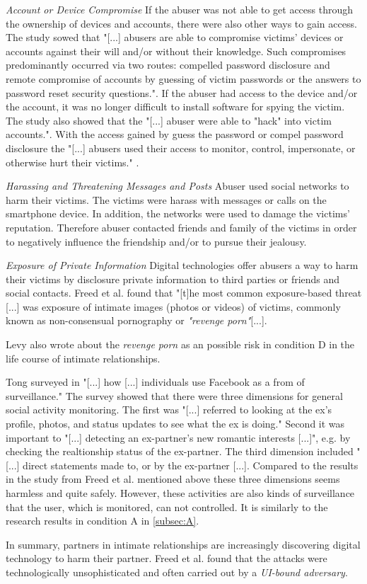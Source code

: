 \textit{Account or Device Compromise}
If the abuser was not able to get access through the ownership of devices and accounts, there were also other ways to gain access. The study sowed that "[...] abusers are able to compromise victims' devices or accounts against their will and/or without their knowledge. Such compromises predominantly occurred via two routes: compelled password disclosure and remote compromise of accounts by guessing of victim passwords or the answers to password reset security questions.". If the abuser had access to the device and/or the account, it was no longer difficult to install software for spying the victim.
The study also showed that the "[...] abuser were able to "hack" into victim accounts.". With the access gained by guess the password or compel password disclosure the "[...] abusers used their access to monitor, control, impersonate, or otherwise hurt their victims." \cite{freed2018stalker}.

\textit{Harassing and Threatening Messages and Posts}
Abuser used social networks to harm their victims. The victims were harass with messages or calls on the smartphone device. In addition, the networks were used to damage the victims' reputation.
Therefore abuser contacted friends and family of the victims in order to negatively influence the friendship and/or to pursue their jealousy.

\textit{Exposure of Private Information}
Digital technologies offer abusers a way to harm their victims by disclosure private information to third parties or friends and social contacts. Freed et al. found that "[t]he most common exposure-based threat [...] was exposure of intimate images (photos or videos) of victims, commonly known as non-consensual pornography or \textit{"revenge porn"}[...].

Levy also wrote about the \textit{revenge porn} as an possible risk in condition D in the life course of intimate relationships.

Tong surveyed in \cite{Tong2013Facebook} "[...] how [...] individuals use Facebook as a from of surveillance." The survey showed that there were three dimensions for general social activity monitoring. The first was "[...] referred to looking at the ex's profile, photos, and status updates to see what the ex is doing." Second it was important to "[...] detecting an ex-partner's new romantic interests [...]", e.g. by checking the realtionship status of the ex-partner. The third dimension included "[...] direct statements made to, or by the ex-partner [...].
Compared to the results in the study from Freed et al. \cite{freed2018stalker} mentioned above these three dimensions seems harmless and quite safely. However, these activities are also kinds of surveillance that the user, which is monitored, can not controlled. It is similarly to the research results in condition A in \ref*{subsec:A}.

In summary, partners in intimate relationships are increasingly discovering digital technology to harm their partner. Freed et al. \cite{freed2018stalker} found that the attacks were technologically unsophisticated and often carried out by a \textit{UI-bound adversary}.









